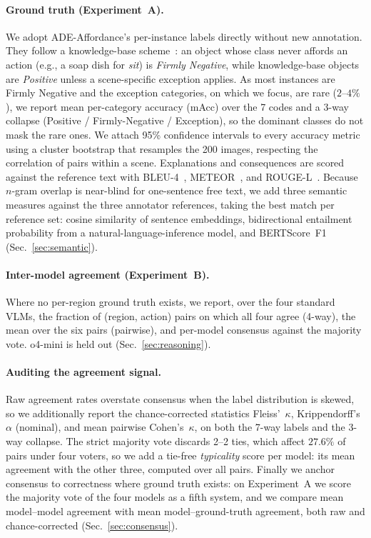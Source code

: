 \documentclass[runningheads]{llncs}
\begin{document}
\paragraph{Ground truth (Experiment~A).}
We adopt ADE-Affordance's per-instance labels directly without new annotation. They follow a knowledge-base scheme~\cite{ade_affordance}: an object whose class never affords an action (e.g., a soap dish for \emph{sit}) is \emph{Firmly Negative}, while knowledge-base objects are \emph{Positive} unless a scene-specific exception applies.
As most instances are Firmly Negative and the exception categories, on which we focus, are rare ($2$--$4\%$), we report mean per-category accuracy (mAcc) over the 7 codes and a 3-way collapse (Positive / Firmly-Negative / Exception), so the dominant classes do not mask the rare ones.
We attach 95\% confidence intervals to every accuracy metric using a cluster bootstrap that resamples the 200 images, respecting the correlation of pairs within a scene.
Explanations and consequences are scored against the reference text with BLEU-4~\cite{bleu}, METEOR~\cite{meteor}, and ROUGE-L~\cite{rouge}.
Because $n$-gram overlap is near-blind for one-sentence free text, we add three semantic measures against the three annotator references, taking the best match per reference set: cosine similarity of sentence embeddings, bidirectional entailment probability from a natural-language-inference model, and BERTScore~F1 (Sec.~\ref{sec:semantic}).

\paragraph{Inter-model agreement (Experiment~B).}
Where no per-region ground truth exists, we report, over the four standard VLMs, the fraction of (region, action) pairs on which all four agree (4-way), the mean over the six pairs (pairwise), and per-model consensus against the majority vote.
o4-mini is held out (Sec.~\ref{sec:reasoning}).

\paragraph{Auditing the agreement signal.}
Raw agreement rates overstate consensus when the label distribution is skewed, so we additionally report the chance-corrected statistics Fleiss'~$\kappa$, Krippendorff's~$\alpha$ (nominal), and mean pairwise Cohen's~$\kappa$, on both the 7-way labels and the 3-way collapse.
The strict majority vote discards 2--2 ties, which affect $27.6\%$ of pairs under four voters, so we add a tie-free \emph{typicality} score per model: its mean agreement with the other three, computed over all pairs.
Finally we anchor consensus to correctness where ground truth exists: on Experiment~A we score the majority vote of the four models as a fifth system, and we compare mean model--model agreement with mean model--ground-truth agreement, both raw and chance-corrected (Sec.~\ref{sec:consensus}).
\end{document}
